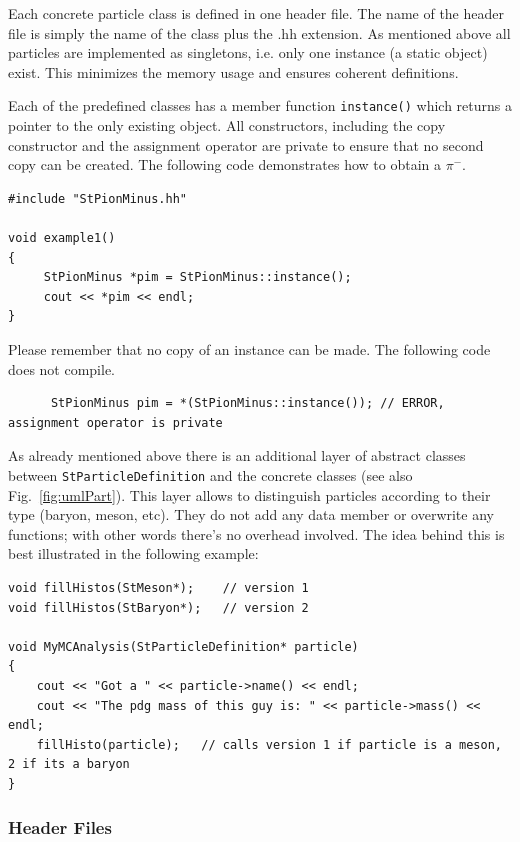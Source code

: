 \documentclass[twoside]{article}
\newcommand{\comp}[1]{\texttt{#1}}%
\begin{document}
\begin{description}
Each concrete
particle class is defined in one header file. The name of the header file is simply
the name of the class plus the .hh extension.
As mentioned above all particles are implemented as singletons, i.e. only one instance
(a static object) exist. This minimizes the memory usage and ensures coherent definitions.

Each of the predefined classes has a member function \comp{instance()} which returns
a pointer to the only existing object. All constructors, including the copy constructor
and the assignment operator are private to ensure that no second copy can be created.
The following code demonstrates how to obtain a $\pi^-$.

{\footnotesize
\begin{verbatim}
#include "StPionMinus.hh"

void example1()
{
     StPionMinus *pim = StPionMinus::instance();
     cout << *pim << endl; 
}
\end{verbatim}
}

Please remember that no copy of an instance can be made. The following code
does not compile.

{\footnotesize
\begin{verbatim}
      StPionMinus pim = *(StPionMinus::instance()); // ERROR, assignment operator is private 
\end{verbatim}
}

As already mentioned above there is an additional layer of abstract classes
between \comp{StParticleDefinition} and the concrete classes (see also Fig.~\ref{fig:umlPart}).
This layer allows to distinguish particles according to their type (baryon, meson, etc).
They do not add any data member or overwrite any functions; with other words there's no overhead involved.
The idea behind this is best illustrated in the following example: 

{\footnotesize
\begin{verbatim}
void fillHistos(StMeson*);    // version 1 
void fillHistos(StBaryon*);   // version 2 

void MyMCAnalysis(StParticleDefinition* particle) 
{ 
    cout << "Got a " << particle->name() << endl; 
    cout << "The pdg mass of this guy is: " << particle->mass() << endl; 
    fillHisto(particle);   // calls version 1 if particle is a meson, 2 if its a baryon 
} 
\end{verbatim}
}

\subsubsection{Header Files}


\end{description}
\end{document}

